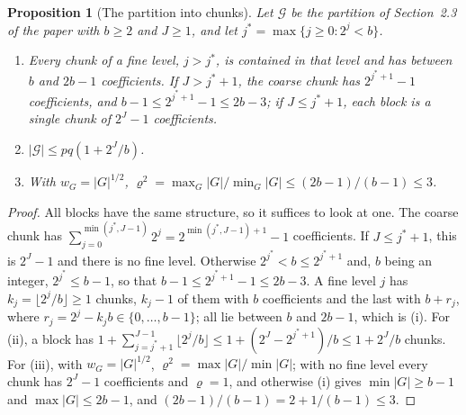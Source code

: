 \documentclass[10pt]{book}
\newtheorem{proposition}{Proposition}[section]
\theoremstyle{definition}
\newcommand{\lev}{j}
\newcommand{\Gcal}{\mathcal{G}}
\newcommand{\jst}{j^{*}}
\begin{document}
{\color{colR1}
\begin{proposition}[The partition into chunks]
\label{prop:balanced}
Let $\Gcal$ be the partition of Section~2.3 of the paper with $b \ge 2$ and
$J \ge 1$, and let $\jst = \max\{\lev \ge 0 : 2^{\lev} < b\}$.
\begin{enumerate}
\item[(i)] Every chunk of a fine level, $\lev > \jst$, is contained in that
level and has between $b$ and $2b-1$ coefficients. If $J > \jst+1$, the coarse
chunk has $2^{\jst+1}-1$ coefficients, and $b-1 \le 2^{\jst+1}-1 \le 2b-3$;
if $J \le \jst+1$, each block is a single chunk of $2^{J}-1$ coefficients.
\item[(ii)] $|\Gcal| \le pq(1 + 2^{J}/b)$.
\item[(iii)] With $w_{G} = |G|^{1/2}$,
$\varrho^{2} = \max_{G}|G|/\min_{G}|G| \le (2b-1)/(b-1) \le 3$.
\end{enumerate}
\end{proposition}

\begin{proof}
All blocks have the same structure, so it suffices to look at one. The coarse
chunk has $\sum_{\lev=0}^{\min(\jst,J-1)}2^{\lev} = 2^{\min(\jst,J-1)+1}-1$
coefficients. If $J \le \jst+1$, this is $2^{J}-1$ and there is no fine level.
Otherwise $2^{\jst} < b \le 2^{\jst+1}$ and, $b$ being an integer,
$2^{\jst} \le b-1$, so that $b-1 \le 2^{\jst+1}-1 \le 2b-3$. A fine level
$\lev$ has $k_{\lev} = \lfloor 2^{\lev}/b\rfloor \ge 1$ chunks, $k_{\lev}-1$ of
them with $b$ coefficients and the last with $b + r_{\lev}$, where
$r_{\lev} = 2^{\lev} - k_{\lev}b \in \{0,\dots,b-1\}$; all lie between $b$ and
$2b-1$, which is (i). For (ii), a block has
$1 + \sum_{\lev=\jst+1}^{J-1}\lfloor 2^{\lev}/b\rfloor \le
1 + (2^{J}-2^{\jst+1})/b \le 1 + 2^{J}/b$ chunks. For (iii), with
$w_{G} = |G|^{1/2}$, $\varrho^{2} = \max|G|/\min|G|$; with no fine level every
chunk has $2^{J}-1$ coefficients and $\varrho = 1$, and otherwise (i) gives
$\min|G| \ge b-1$ and $\max|G| \le 2b-1$, and
$(2b-1)/(b-1) = 2 + 1/(b-1) \le 3$.
\end{proof}
}
\end{document}
